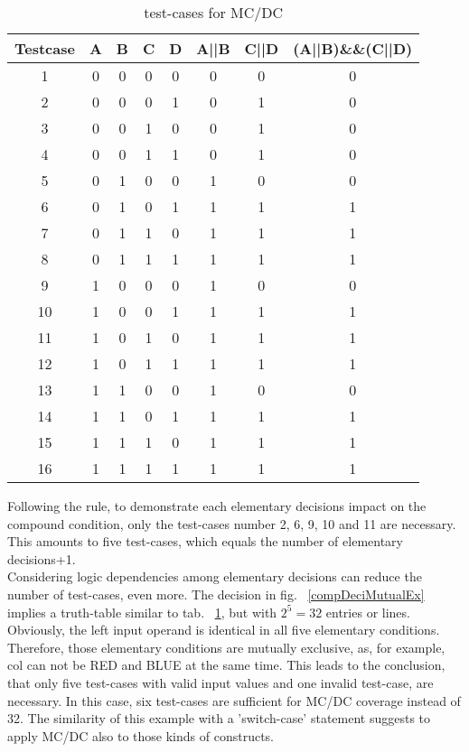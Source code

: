 		\begin{table}[h!]
		\begin{center}
			\begin{tabular}{c|c|c|c|c|c|c|c}
			Testcase & A 	& B		& C		& D		& A||B	& C||D	& (A||B)\&\&(C||D)	\\ \hline
			1		 & 0 & 0	& 0	& 0	& 0	& 0	& 0	\\ \hline
			2		 & 0	& 0	& 0	& 1 	& 0	& 1	& 0	\\ \hline
			3		 & 0	& 0	& 1	& 0	& 0	& 1	& 0	\\ \hline
			4		 & 0	& 0	& 1	& 1 	& 0	& 1	& 0	\\ \hline
			5		 & 0	& 1	& 0	& 0	& 1	& 0	& 0	\\ \hline
			6		 & 0	& 1	& 0	& 1 	& 1	& 1	& 1	\\ \hline
			7		 & 0	& 1	& 1	& 0	& 1	& 1	& 1	\\ \hline
			8		 & 0	& 1	& 1	& 1 	& 1	& 1	& 1	\\ \hline
			9		 & 1	& 0	& 0	& 0	& 1	& 0	& 0	\\ \hline
			10		 & 1	& 0	& 0	& 1 	& 1	& 1	& 1	\\ \hline
			11		 & 1	& 0	& 1	& 0	& 1	& 1	& 1	\\ \hline
			12		 & 1	& 0	& 1	& 1 	& 1	& 1	& 1	\\ \hline
			13		 & 1	& 1	& 0	& 0	& 1	& 0	& 0	\\ \hline
			14		 & 1	& 1	& 0	& 1 	& 1	& 1	& 1	\\ \hline
			15		 & 1	& 1	& 1	& 0	& 1	& 1	& 1	\\ \hline
			16		 & 1	& 1	& 1	& 1 	& 1	& 1	& 1	\\ \hline
			\end{tabular}
			\caption{test-cases for MC/DC}
			\label{MCDCtable}
		\end{center}
	\end{table}
	Following the rule, to demonstrate each elementary decisions impact on the compound condition, only the test-cases number 2, 6, 9, 10 and 11 are necessary. This amounts to five test-cases, which equals the number of elementary decisions+1. \\
	Considering logic dependencies among elementary decisions can reduce the number of test-cases, even more. The decision in fig. ~\ref{compDeciMutualEx} implies a truth-table similar to tab. ~\ref{MCDCtable}, but with $2^{5} = 32$ entries or lines. Obviously, the left input operand is identical in all five elementary conditions. Therefore, those elementary conditions are mutually exclusive, as, for example, col can not be RED and BLUE at the same time. This leads to the conclusion, that only five test-cases with valid input values and one invalid test-case, are necessary. In this case, six test-cases are sufficient for MC/DC coverage instead of 32. The similarity of this example with a 'switch-case' statement  suggests to apply MC/DC also to those kinds of constructs. \\
